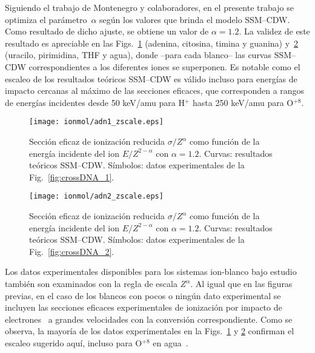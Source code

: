 Siguiendo el trabajo de Montenegro y colaboradores, en el presente 
trabajo se optimiza el parámetro~$\alpha$ según los valores que brinda 
el modelo SSM--CDW. Como resultado de dicho ajuste, se obtiene un valor
de $\alpha=1.2$. La validez de este resultado es apreciable en las 
Figs.~\ref{fig:zreduced-adn1} (adenina, citosina, timina y guanina) 
y~\ref{fig:zreduced-adn2} (uracilo, pirimidina, THF y agua), donde 
--para cada blanco-- las curvas SSM--CDW correspondientes a los 
diferentes iones se superponen. Es notable como 
el escaleo de los resultados teóricos SSM--CDW es válido incluso para 
energías de impacto cercanas al máximo de las secciones eficaces, que 
corresponden a rangos de energías incidentes desde 50 keV/amu para H$^+$ 
hasta 250 keV/amu para O$^{+8}$.

\begin{figure}
\centering
\texttt{[image: ionmol/adn1\_zscale.eps]}
\caption[Sección eficaz de ionización reducida por $Z$ y $\alpha$ 
(Parte I).]
{Sección eficaz de ionización reducida $\sigma/Z^{\alpha}$ como función
de la energía incidente del ion $E/Z^{2-\alpha}$ con $\alpha=1.2$. 
Curvas: resultados teóricos SSM--CDW. 
Símbolos: datos experimentales de la Fig.~\ref{fig:crossDNA_1}.}
\label{fig:zreduced-adn1}
\end{figure} 

\begin{figure}
\centering
\texttt{[image: ionmol/adn2\_zscale.eps]}
\caption[Sección eficaz de ionización reducida por $Z$ y $\alpha$ 
(Parte II).]
{Sección eficaz de ionización reducida $\sigma/Z^{\alpha}$ como función
de la energía incidente del ion $E/Z^{2-\alpha}$ con $\alpha=1.2$. 
Curvas: resultados teóricos SSM--CDW. 
Símbolos: datos experimentales de la Fig.~\ref{fig:crossDNA_2}.}
\label{fig:zreduced-adn2}
\end{figure} 

Los datos experimentales disponibles para los sistemas ion-blanco bajo 
estudio~\cite{Iriki:11,Sens:20,Bhattacharjee:19,itoh2013,wolff2014,
wang2016,agnihotri2012,agnihotri2013,Luna2007,Bolorizadeh86,H_Rudd85,
He_Rudd85,toburen80,Ohsawa05,Bhattacharjee:17,DalCappello:09,
Bhattacharjee:16} también son examinados con la regla de escala 
$Z^\alpha$. Al igual que en las figuras previas, en el caso de los 
blancos con pocos o ningún dato experimental se incluyen las secciones 
eficaces experimentales de ionización por impacto de 
electrones~\cite{Rahman:16,bug2017,wolf2019,fuss2009} a grandes 
velocidades con la conversión correspondiente. Como se observa, la 
mayoría de los datos experimentales en la Figs.~\ref{fig:zreduced-adn1} 
y \ref{fig:zreduced-adn2} confirman el escaleo sugerido aquí, incluso 
para O$^{+8}$ en agua~\cite{Bhattacharjee:16}. 

